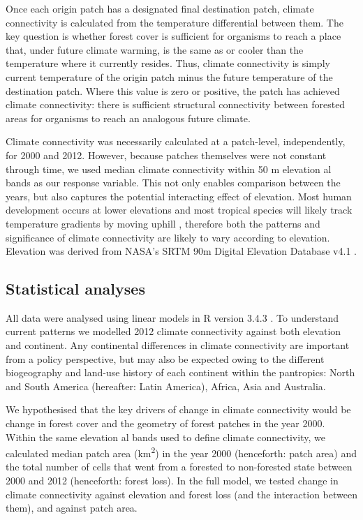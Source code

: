 \documentclass[12pt,a4paper,]{report}
\theoremstyle{definition}
\theoremstyle{definition}
\theoremstyle{definition}
\theoremstyle{remark}
\begin{document}
Once each origin patch has a designated final destination patch, climate
connectivity is calculated from the temperature differential between
them. The key question is whether forest cover is sufficient for
organisms to reach a place that, under future climate warming, is the
same as or cooler than the temperature where it currently resides. Thus,
climate connectivity is simply current temperature of the origin patch
minus the future temperature of the destination patch. Where this value
is zero or positive, the patch has achieved climate connectivity: there
is sufficient structural connectivity between forested areas for
organisms to reach an analogous future climate.

Climate connectivity was necessarily calculated at a patch-level,
independently, for 2000 and 2012. However, because patches themselves
were not constant through time, we used median climate connectivity
within 50 m elevation al bands as our response variable. This not only
enables comparison between the years, but also captures the potential
interacting effect of elevation. Most human development occurs at lower
elevations and most tropical species will likely track temperature
gradients by moving uphill \citep{loarie_velocity_2009}, therefore both
the patterns and significance of climate connectivity are likely to vary
according to elevation. Elevation was derived from NASA's SRTM 90m
Digital Elevation Database v4.1 \citep{nasa_srtm_2008}.

\subsection{Statistical analyses}\label{statistical-analyses-1}

All data were analysed using linear models in R version 3.4.3
\citep{r_core_team_2017}. To understand current patterns we modelled
2012 climate connectivity against both elevation and continent. Any
continental differences in climate connectivity are important from a
policy perspective, but may also be expected owing to the different
biogeography and land-use history of each continent within the
pantropics: North and South America (hereafter: Latin America), Africa,
Asia and Australia.

We hypothesised that the key drivers of change in climate connectivity
would be change in forest cover and the geometry of forest patches in
the year 2000. Within the same elevation al bands used to define climate
connectivity, we calculated median patch area (km\textsuperscript{2}) in
the year 2000 (henceforth: patch area) and the total number of cells
that went from a forested to non-forested state between 2000 and 2012
(henceforth: forest loss). In the full model, we tested change in
climate connectivity against elevation and forest loss (and the
interaction between them), and against patch area.
\end{document}
